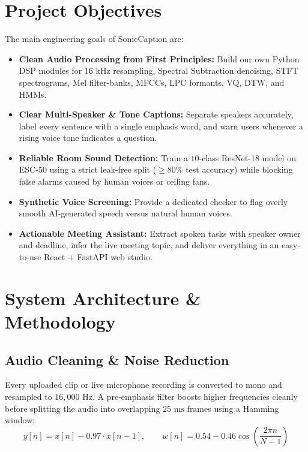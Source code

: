 \documentclass[letterpaper,12pt]{article}
\begin{document}
\section{Project Objectives}
The main engineering goals of SonicCaption are:
\begin{itemize}
    \item \textbf{Clean Audio Processing from First Principles:} Build our own Python DSP modules for $16\text{ kHz}$ resampling, Spectral Subtraction denoising, STFT spectrograms, Mel filter-banks, MFCCs, LPC formants, VQ, DTW, and HMMs.
    \item \textbf{Clear Multi-Speaker \& Tone Captions:} Separate speakers accurately, label every sentence with a single emphasis word, and warn users whenever a rising voice tone indicates a question.
    \item \textbf{Reliable Room Sound Detection:} Train a $10$-class ResNet-18 model on ESC-50 using a strict leak-free split ($\ge 80\%$ test accuracy) while blocking false alarms caused by human voices or ceiling fans.
    \item \textbf{Synthetic Voice Screening:} Provide a dedicated checker to flag overly smooth AI-generated speech versus natural human voices.
    \item \textbf{Actionable Meeting Assistant:} Extract spoken tasks with speaker owner and deadline, infer the live meeting topic, and deliver everything in an easy-to-use React + FastAPI web studio.
\end{itemize}

\section{System Architecture \& Methodology}

\subsection{Audio Cleaning \& Noise Reduction}
Every uploaded clip or live microphone recording is converted to mono and resampled to $16{,}000\text{ Hz}$. A pre-emphasis filter boosts higher frequencies cleanly before splitting the audio into overlapping $25\text{ ms}$ frames using a Hamming window:
\begin{equation}
y[n] = x[n] - 0.97 \cdot x[n-1], \qquad w[n] = 0.54 - 0.46 \cos\!\left(\frac{2\pi n}{N - 1}\right)
\end{equation}
\end{document}
